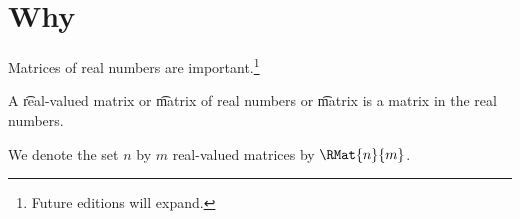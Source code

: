 
\section{Why}

Matrices of real numbers are important.\footnote{Future editions will expand.}


A \t{real-valued matrix} or \t{matrix of real numbers} or \t{matrix} is a matrix in the real numbers.


We denote the set $n$ by $m$ real-valued matrices by $\RMat{n}{m}$.

\blankpage
